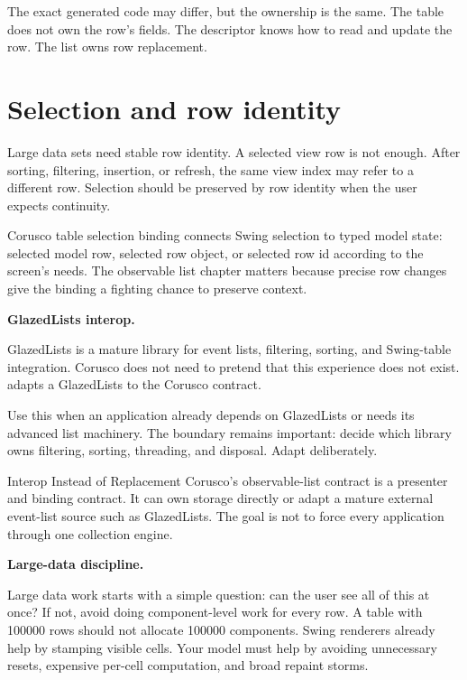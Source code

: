 The exact generated code may differ, but the ownership is the same. The table
does not own the row's fields. The descriptor knows how to read and update the
row. The list owns row replacement.

\section{Selection and row identity}

Large data sets need stable row identity. A selected view row is not enough.
After sorting, filtering, insertion, or refresh, the same view index may refer
to a different row. Selection should be preserved by row identity when the user
expects continuity.

Corusco table selection binding connects Swing selection to typed model state:
selected model row, selected row object, or selected row id according to the
screen's needs. The observable list chapter matters because precise row changes
give the binding a fighting chance to preserve context.

\textbf{GlazedLists interop.}

GlazedLists is a mature library for event lists, filtering, sorting, and
Swing-table integration. Corusco does not need to pretend that this experience
does not exist.  adapts a GlazedLists 
to the Corusco  contract.

Use this when an application already depends on GlazedLists or needs its
advanced list machinery. The boundary remains important: decide which library
owns filtering, sorting, threading, and disposal. Adapt deliberately.

\begin{coruscobox}{Interop Instead of Replacement}
Corusco's observable-list contract is a presenter and binding contract. It can
own storage directly or adapt a mature external event-list source such as
GlazedLists. The goal is not to force every application through one collection
engine.
\end{coruscobox}

\textbf{Large-data discipline.}

Large data work starts with a simple question: can the user see all of this at
once? If not, avoid doing component-level work for every row. A table with
100000 rows should not allocate 100000 components. Swing renderers already help
by stamping visible cells. Your model must help by avoiding unnecessary resets,
expensive per-cell computation, and broad repaint storms.

